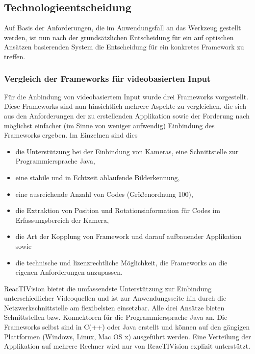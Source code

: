 
\subsection{Technologieentscheidung} %
\label{sub:technologieentscheidung}

Auf Basis der Anforderungen, die im Anwendungsfall an das Werkzeug gestellt werden, ist nun nach der grundsätzlichen Entscheidung für ein auf optischen Ansätzen basierenden System die Entscheidung für ein konkretes Framework zu treffen. 

\subsubsection{Vergleich der Frameworks für videobasierten Input}\label{subs:vergleich_video_frameworks}

Für die Anbindung von videobasiertem Input wurde drei Frameworks vorgestellt. Diese Frameworks sind nun hinsichtlich mehrere Aspekte zu vergleichen, die sich aus den Anforderungen der zu erstellenden Applikation sowie der Forderung nach möglichst einfacher (im Sinne von weniger aufwendig) Einbindung des Frameworks ergeben. Im Einzelnen sind dies 
\begin{itemize}
	\item die Unterstützung bei der Einbindung von Kameras, eine Schnittstelle zur Programmiersprache Java,
	\item eine stabile und in Echtzeit ablaufende Bilderkennung,
	\item eine ausreichende Anzahl von Codes (Größenordnung 100),
	\item die Extraktion von Position und Rotationsinformation für Codes im Erfassungsbereich der Kamera,
	\item die Art der Kopplung von Framework und darauf aufbauender Applikation sowie
	\item die technische und lizenzrechtliche Möglichkeit, die Frameworks an die eigenen Anforderungen anzupassen.
\end{itemize}
    
ReacTIVision bietet die umfassendste Unterstützung zur Einbindung unterschiedlicher Videoquellen und ist zur Anwendungsseite hin durch die Netzwerkschnittstelle am flexibelsten einsetzbar. Alle drei Ansätze bieten Schnittstellen bzw. Konnektoren für die Programmiersprache Java an. Die Frameworks selbst sind in C(++) oder Java erstellt und können auf den gängigen Plattformen (Windows, Linux, Mac OS x) ausgeführt werden. Eine Verteilung der Applikation auf mehrere Rechner wird nur von ReacTIVision explizit unterstützt.


